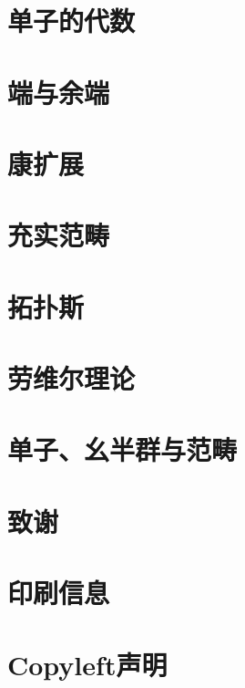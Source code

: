 \chapter{单子的代数}\label{algebras-for-monads}


\chapter{端与余端}\label{ends-and-coends}


\chapter{康扩展}\label{kan-extensions}


\chapter{充实范畴}\label{enriched-categories}


\chapter{拓扑斯}\label{topoi}


\chapter{劳维尔理论}\label{lawvere-theories}


\chapter{单子、幺半群与范畴}\label{monads-monoids-categories}


\backmatter

\appendix
{}


\makeatletter\@openrightfalse
\chapter*{致谢}\label{acknowledgments}


\chapter*{印刷信息}\label{colophon}


\chapter*{Copyleft声明}\label{copyleft}

\@openrighttrue\makeatother
\afterpage{\blankpage}
